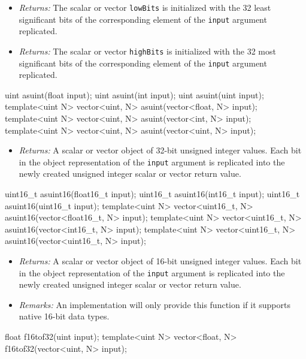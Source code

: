 \begin{itemize}
  \item \textit{Returns:} The scalar or vector \texttt{lowBits} is initialized
  with the 32 least significant bits of the corresponding element of the
  \texttt{input} argument replicated.
  \item \textit{Returns:} The scalar or vector \texttt{highBits} is initialized
  with the 32 most significant bits of the corresponding element of the
  \texttt{input} argument replicated.
\end{itemize}

\begin{HLSL}
uint asuint(float input);
uint asuint(int input);
uint asuint(uint input);
template<uint N> vector<uint, N> asuint(vector<float, N> input);
template<uint N> vector<uint, N> asuint(vector<int, N> input);
template<uint N> vector<uint, N> asuint(vector<uint, N> input);
\end{HLSL}

\begin{itemize}
  \item \textit{Returns:} A scalar or vector object of 32-bit unsigned integer
  values. Each bit in the object representation of the \texttt{input} argument
  is replicated into the newly created unsigned integer scalar or vector return
  value.
\end{itemize}

\begin{HLSL}
uint16_t asuint16(float16_t input);
uint16_t asuint16(int16_t input);
uint16_t asuint16(uint16_t input);
template<uint N> vector<uint16_t, N> asuint16(vector<float16_t, N> input);
template<uint N> vector<uint16_t, N> asuint16(vector<int16_t, N> input);
template<uint N> vector<uint16_t, N> asuint16(vector<uint16_t, N> input);
\end{HLSL}

\begin{itemize}
  \item \textit{Returns:} A scalar or vector object of 16-bit unsigned integer
  values. Each bit in the object representation of the \texttt{input} argument
  is replicated into the newly created unsigned integer scalar or vector return
  value.
  \item \textit{Remarks:} An implementation will only provide this function if
  it supports native 16-bit data types.
\end{itemize}

\begin{HLSL}
float f16tof32(uint input);
template<uint N> vector<float, N> f16tof32(vector<uint, N> input);
\end{HLSL}


